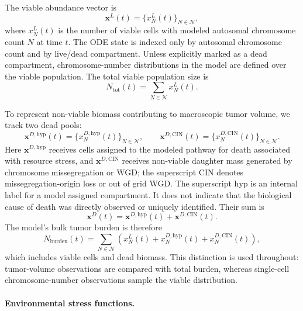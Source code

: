 \documentclass[11pt]{article}
\begin{document}
The viable abundance vector is
\begin{equation}
\mathbf{x}^L(t)=\{x_N^L(t)\}_{N\in\mathcal N},
\label{eq:appendix_viable_vector}
\end{equation}
where $x_N^L(t)$ is the number of viable cells with modeled autosomal chromosome count $N$ at time $t$. The ODE state is indexed only by autosomal chromosome count and by live/dead compartment. Unless explicitly marked as a dead compartment, chromosome-number distributions in the model are defined over the viable population. The total viable population size is
\begin{equation}
N_{\mathrm{tot}}(t)=\sum_{N\in\mathcal N}x_N^L(t).
\label{eq:appendix_total_viable_population}
\end{equation}

To represent non-viable biomass contributing to macroscopic tumor volume, we track two dead pools:
\begin{equation}
\mathbf{x}^{D,\mathrm{hyp}}(t)=\{x_{N}^{D,\mathrm{hyp}}(t)\}_{N\in\mathcal N},
\qquad
\mathbf{x}^{D,\mathrm{CIN}}(t)=\{x_{N}^{D,\mathrm{CIN}}(t)\}_{N\in\mathcal N}.
\label{eq:appendix_dead_pools}
\end{equation}
Here $\mathbf{x}^{D,\mathrm{hyp}}$ receives cells assigned to the modeled pathway for death associated with resource stress, and $\mathbf{x}^{D,\mathrm{CIN}}$ receives non-viable daughter mass generated by chromosome missegregation or WGD; the superscript $\mathrm{CIN}$ denotes missegregation-origin loss or out of grid WGD. The superscript $\mathrm{hyp}$ is an internal label for a model assigned compartment. It does not indicate that the biological cause of death was directly observed or uniquely identified. Their sum is
\begin{equation}
\mathbf{x}^{D}(t)=\mathbf{x}^{D,\mathrm{hyp}}(t)+\mathbf{x}^{D,\mathrm{CIN}}(t).
\label{eq:appendix_total_dead_pool}
\end{equation}
The model's bulk tumor burden is therefore
\begin{equation}
N_{\mathrm{burden}}(t)
=
\sum_{N\in\mathcal N}
\left(x_{N}^L(t)+x_{N}^{D,\mathrm{hyp}}(t)+x_{N}^{D,\mathrm{CIN}}(t)\right),
\label{eq:appendix_tumor_burden}
\end{equation}
which includes viable cells and dead biomass. This distinction is used throughout: tumor-volume observations are compared with total burden, whereas single-cell chromosome-number observations sample the viable distribution.

\paragraph{Environmental stress functions.}
\end{document}
